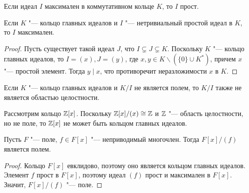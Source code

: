 \begin{corollary}
	Если идеал $I$ максимален в коммутативном кольце $K$, то $I$ прост.
\end{corollary}

\begin{proposition}
	Если $K$ "--- кольцо главных идеалов и $I$ "--- нетривиальный простой идеал в $K$, то $I$ максимален.
\end{proposition}

\begin{proof}
	Пусть существует такой идеал $J$, что $I \subsetneq J \subsetneq K$. Поскольку $K$ "--- кольцо главных идеалов, то $I = (x), J = (y)$, где $x, y \in K \backslash (\{0\} \cup K^*)$, причем $x$ "--- простой элемент. Тогда $y \mid x$, что противоречит неразложимости $x$ в $K$.
\end{proof}

\begin{corollary}
	Если $K$ "--- кольцо главных идеалов и $K / I$ не является полем, то $K / I$ также не является областью целостности.
\end{corollary}

\begin{example}
	Рассмотрим кольцо $\mathbb{Z}[x]$. Поскольку $\mathbb{Z}[x] / (x) \cong \mathbb{Z}$ и $\mathbb{Z}$ "--- область целостности, но не поле, то $\mathbb{Z}[x]$ не может быть кольцом главных идеалов.
\end{example}

\begin{corollary}
	Пусть $F$ "--- поле, $f \in F[x]$ "--- неприводимый многочлен. Тогда $F[x] / (f)$ является полем.
\end{corollary}

\begin{proof}
	Кольцо $F[x]$ евклидово, поэтому оно является кольцом главных идеалов. Элемент $f$ прост в $F[x]$, поэтому идеал $(f)$ прост и максимален в $F[x]$. Значит, $F[x] / (f)$ "--- поле.
\end{proof}